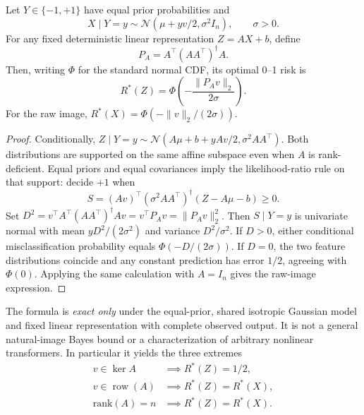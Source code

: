 \begin{theorem}\label{thm:gaussian}
Let $Y\in\{-1,+1\}$ have equal prior probabilities and
\begin{equation}\label{eq:gauss_model}
 X\mid Y=y\sim\mathcal N(\mu+yv/2,\sigma^2I_n),\qquad\sigma>0.
\end{equation}
For any fixed deterministic linear representation $Z=AX+b$, define
\begin{equation}\label{eq:projector}
 P_A=A^\top(AA^\top)^\dagger A.
\end{equation}
Then, writing $\Phi$ for the standard normal CDF, its optimal 0--1 risk is
\begin{equation}\label{eq:bayes}
 \boxed{R^*(Z)=\Phi\left(-\frac{\|P_Av\|_2}{2\sigma}\right)}.
\end{equation}
For the raw image, $R^*(X)=\Phi(-\|v\|_2/(2\sigma))$.
\end{theorem}
\begin{proof}
Conditionally, $Z\mid Y=y\sim\mathcal N(A\mu+b+yAv/2,\sigma^2AA^\top)$. Both distributions are supported on the same affine subspace even when $A$ is rank-deficient. Equal priors and equal covariances imply the likelihood-ratio rule on that support: decide $+1$ when
\begin{equation}\label{eq:discriminant}
 S=(Av)^\top(\sigma^2 AA^\top)^\dagger(Z-A\mu-b)\ge0.
\end{equation}
Set $D^2=v^\top A^\top(AA^\top)^\dagger Av=v^\top P_A v=\|P_A v\|_2^2$. Then $S\mid Y=y$ is univariate normal with mean $yD^2/(2\sigma^2)$ and variance $D^2/\sigma^2$. If $D>0$, either conditional misclassification probability equals $\Phi(-D/(2\sigma))$. If $D=0$, the two feature distributions coincide and any constant prediction has error $1/2$, agreeing with $\Phi(0)$. Applying the same calculation with $A=I_n$ gives the raw-image expression.
\end{proof}
The formula is \emph{exact only} under the equal-prior, shared isotropic Gaussian model and fixed linear representation with complete observed output. It is not a general natural-image Bayes bound or a characterization of arbitrary nonlinear transformers. In particular it yields the three extremes
\begin{align}
 v\in\ker A&\implies R^*(Z)=1/2,\label{eq:nullcase}\\
 v\in\operatorname{row}(A)&\implies R^*(Z)=R^*(X),\label{eq:rowcase}\\
 \mathrm{rank}(A)=n&\implies R^*(Z)=R^*(X).\label{eq:fullcase}
\end{align}

